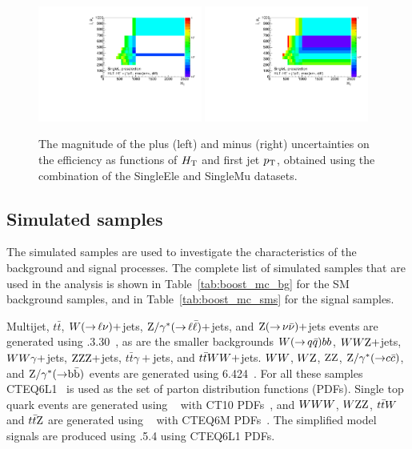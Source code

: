 \begin{figure}[htpb]
\centering
\includegraphics[width=0.48\textwidth]{figures/razor_trigger/h_HT_j1pt_0_pre_errdiff_up_ph_l_log}
\includegraphics[width=0.48\textwidth]{figures/razor_trigger/h_HT_j1pt_0_pre_errdiff_low_ph_l_log}
\caption{The magnitude of the plus (left) and minus (right) uncertainties on the efficiency as 
functions of $H_{\mathrm{T}}$ and first jet $p_{\mathrm{T}}$, obtained using the combination of the SingleEle and SingleMu 
datasets. 
\label{fig:boost_trigger_efficiency_unc}}
\end{figure}



\subsection{Simulated samples \label{sec:boost_mc_samples}}

The simulated samples are used to investigate the characteristics of the background and signal
processes.  The complete list of simulated samples that are used in the analysis is shown in 
Table~\ref{tab:boost_mc_bg} for the SM background samples, and in Table~\ref{tab:boost_mc_sms} for the 
signal samples. 

Multijet, $t\bar{t}$, $W({\rightarrow}\,\ell\nu)+$jets, $\mathrm{Z}/\gamma^*({\rightarrow}\,
\ell\bar{\ell})+$jets, and $\mathrm{Z}({\rightarrow}\, \nu \bar{\nu})+$jets events are generated using
.3.30~\cite{Alwall:2011uj}, as are the smaller backgrounds $W({\rightarrow}\, q
\bar{q})bb$, 
$WW\mathrm{Z}+$jets, $WW\gamma+$jets, $\mathrm{Z}\mathrm{Z}\mathrm{Z}+$jets, $t\bar{t}\gamma+$jets, and
$t\bar{t}WW+$jets.
$WW$, $W\mathrm{Z}$, $\mathrm{Z}\mathrm{Z}$,  $\mathrm{Z}/\gamma^*({\rightarrow} c\bar{c})$, and 
$\mathrm{Z}/\gamma^*({\rightarrow} \mathrm{b}\bar{\mathrm{b}})$ events are generated using 
{\PYTHIA}6.424~\cite{Sjostrand:2006za}.
For all these samples CTEQ6L1~\cite{Pumplin:2002vw} is used as the set of parton distribution
functions (PDFs). 
Single top quark events are generated using ~\cite{powheg,powheg2} with CT10
PDFs~\cite{Lai:2010vv}, and $WWW$, $W\mathrm{Z}\mathrm{Z}$, $t\bar{t}W$ and $t\bar{t}\mathrm{Z}$ are generated using
\AMCATNLO~\cite{Frixione:2002ik} with CTEQ6M PDFs~\cite{Pumplin:2002vw}. 
The simplified model signals are produced using .5.4 using CTEQ6L1 PDFs.  

